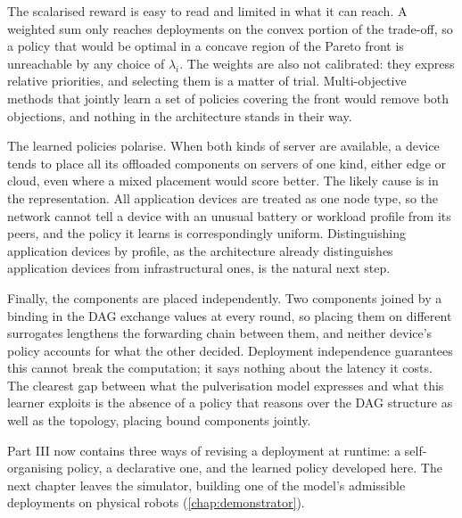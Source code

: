 The scalarised reward is easy to read and limited in what it can reach.
%
A weighted sum only reaches deployments on the convex portion of the trade-off,
so a policy that would be optimal in a concave region of the Pareto front is unreachable by any choice of $\lambda_i$.
%
The weights are also not calibrated:
they express relative priorities, and selecting them is a matter of trial.
%
Multi-objective methods that jointly learn a set of policies covering the front would remove both objections,
and nothing in the architecture stands in their way.

The learned policies polarise.
%
When both kinds of server are available,
a device tends to place all its offloaded components on servers of one kind, either edge or cloud,
even where a mixed placement would score better.
%
The likely cause is in the representation.
All application devices are treated as one node type,
so the network cannot tell a device with an unusual battery or workload profile from its peers,
and the policy it learns is correspondingly uniform.
%
Distinguishing application devices by profile,
as the architecture already distinguishes application devices from infrastructural ones,
is the natural next step.

Finally, the components are placed independently.
%
Two components joined by a binding in the \ac{DAG} exchange values at every round,
so placing them on different surrogates lengthens the forwarding chain between them,
and neither device's policy accounts for what the other decided.
%
Deployment independence guarantees this cannot break the computation;
it says nothing about the latency it costs.
%
The clearest gap between what the pulverisation model expresses and what this learner exploits
is the absence of a policy that reasons over the \ac{DAG} structure as well as the topology, placing bound components jointly.

Part III now contains three ways of revising a deployment at runtime:
a self-organising policy, a declarative one, and the learned policy developed here.
%
The next chapter leaves the simulator, building one of the model's admissible deployments on physical robots (\cref{chap:demonstrator}).
